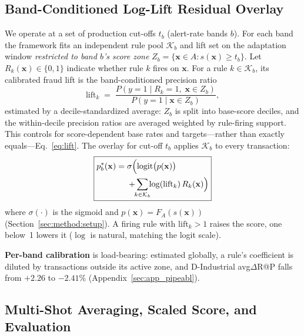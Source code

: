 \documentclass[11pt]{article}
\begin{document}
\subsection{Band-Conditioned Log-Lift Residual Overlay}
\label{sec:method:nb}

We operate at a set of production cut-offs $t_b$ (alert-rate bands $b$). For each band the
framework fits an independent rule pool $\mathcal{K}_b$ and lift set on the adaptation window
\emph{restricted to band $b$'s score zone} $Z_b=\{\mathbf{x}\in A: s(\mathbf{x})\ge t_b\}$.
Let $R_k(\mathbf{x})\in\{0,1\}$ indicate whether rule $k$ fires on $\mathbf{x}$.
For a rule $k\in\mathcal{K}_b$, its calibrated fraud lift is the band-conditioned precision ratio
\begin{equation}
  \mathrm{lift}_k \;=\;
    \frac{P\!\left(y=1 \mid R_k=1,\; \mathbf{x}\in Z_b\right)}
         {P\!\left(y=1 \mid \mathbf{x}\in Z_b\right)},
  \label{eq:lift}
\end{equation}
estimated by a decile-standardized average: $Z_b$ is split into base-score deciles, and the
within-decile precision ratios are averaged weighted by rule-firing support. This controls for
score-dependent base rates and targets---rather than exactly equals---Eq.~\eqref{eq:lift}.
The overlay for cut-off $t_b$ applies $\mathcal{K}_b$ to every transaction:
\begin{equation}
  \boxed{%
  \begin{aligned}
    p^*_b(\mathbf{x}) ={}& \sigma\Bigl(\operatorname{logit}\bigl(p(\mathbf{x})\bigr) \\
    &{}+ \!\!\sum_{k\in\mathcal{K}_b}\!\! \log(\mathrm{lift}_k)\,R_k(\mathbf{x})\Bigr)
  \end{aligned}}
  \label{eq:overlay}
\end{equation}
where $\sigma(\cdot)$ is the sigmoid and $p(\mathbf{x})=F_A(s(\mathbf{x}))$
(Section~\ref{sec:method:setup}). A firing rule with $\mathrm{lift}_k>1$ raises the score, one
below~1 lowers it ($\log$ is natural, matching the logit scale).

\textbf{Per-band calibration} is load-bearing: estimated globally, a rule's coefficient is diluted
by transactions outside its active zone, and D-Industrial avg$\Delta$R@P falls from $+2.26$ to
$-2.41\%$ (Appendix~\ref{sec:app_pipeabl}).

\subsection{Multi-Shot Averaging, Scaled Score, and Evaluation}
\label{sec:method:ensemble}
\end{document}
